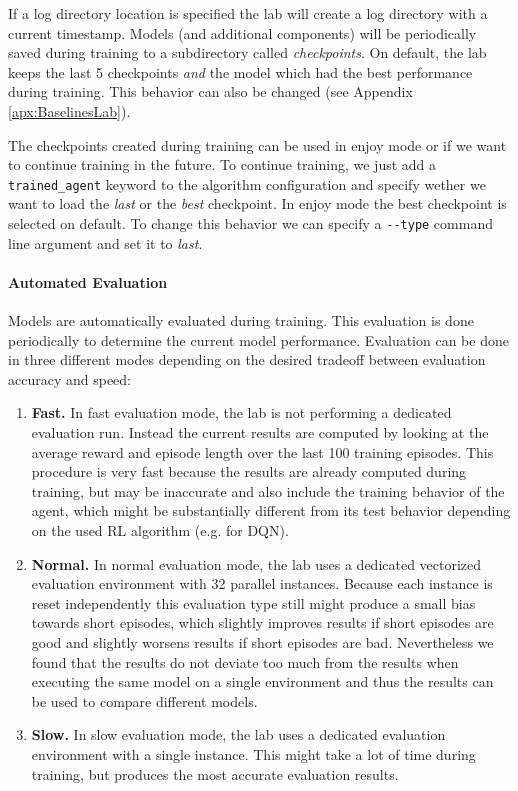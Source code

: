 If a log directory location is specified the lab will create a log directory with a current timestamp. Models (and additional components) will be periodically saved during training to a subdirectory called \textit{checkpoints}. On default, the lab keeps the last 5 checkpoints \textit{and} the model which had the best performance during training. This behavior can also be changed (see Appendix \ref{apx:BaselinesLab}).

The checkpoints created during training can be used in enjoy mode or if we want to continue training in the future. To continue training, we just add a \texttt{trained\_agent} keyword to the algorithm configuration and specify wether we want to load the \textit{last} or the \textit{best} checkpoint. In enjoy mode the best checkpoint is selected on default. To change this behavior we can specify a \texttt{-{}-type} command line argument and set it to \textit{last}.

\paragraph{Automated Evaluation}
Models are automatically evaluated during training. This evaluation is done periodically to determine the current model performance. Evaluation can be done in three different modes depending on the desired tradeoff between evaluation accuracy and speed:

\begin{enumerate}
    \item \textbf{Fast.} In fast evaluation mode, the lab is not performing a dedicated evaluation run. Instead the current results are computed by looking at the average reward and episode length over the last 100 training episodes. This procedure is very fast because the results are already computed during training, but may be inaccurate and also include the training behavior of the agent, which might be substantially different from its test behavior depending on the used RL algorithm (e.g. for DQN).
    \item \textbf{Normal.} In normal evaluation mode, the lab uses a dedicated vectorized evaluation environment with 32 parallel instances. Because each instance is reset independently this evaluation type still might produce a small bias towards short episodes, which slightly improves results if short episodes are good and slightly worsens results if short episodes are bad. Nevertheless we found that the results do not deviate too much from the results when executing the same model on a single environment and thus the results can be used to compare different models.
    \item \textbf{Slow.} In slow evaluation mode, the lab uses a dedicated evaluation environment with a single instance. This might take a lot of time during training, but produces the most accurate evaluation results. 
\end{enumerate}

